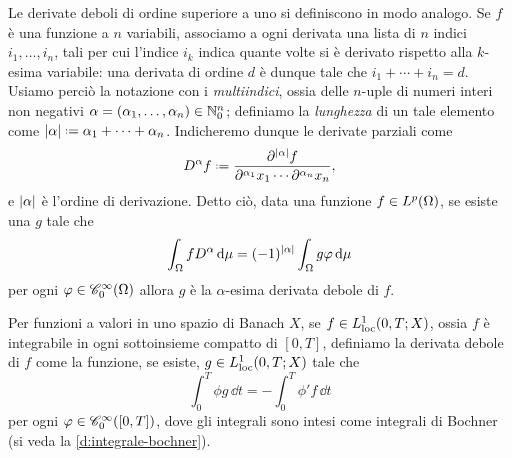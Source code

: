 Le derivate deboli di ordine superiore a uno si definiscono in modo analogo.
Se $f$ è una funzione a $n$ variabili, associamo a ogni derivata una lista di $n$ indici $i_1,\dotsc,i_n$, tali per cui l'indice $i_k$ indica quante volte si è derivato rispetto alla $k$-esima variabile: una derivata di ordine $d$ è dunque tale che $i_1+\dotsb+i_n=d$.
Usiamo perciò la notazione con i \emph{multiindici}, ossia delle $n$-uple di numeri interi non negativi $\alpha=(\alpha_1,\dotsc,\alpha_n)\in\N_0^n$; definiamo la \emph{lunghezza} di un tale elemento come $\abs{\alpha}\defeq\alpha_1+\dotsb+\alpha_n$.
Indicheremo dunque le derivate parziali come
\begin{equation}
    D^\alpha f\defeq\frac{\partial^{\abs{\alpha}}f}{\partial^{\alpha_1}x_1\dotsm\partial^{\alpha_n}x_n},
\end{equation}
e $\abs{\alpha}$ è l'ordine di derivazione.
Detto ciò, data una funzione $f\in\leb[p]{\Omega}$, se esiste una $g$ tale che
\begin{equation}
    \int_\Omega fD^\alpha\,\dd\mu=(-1)^{\abs{\alpha}}\int_\Omega g\phi\,\dd\mu
\end{equation}
per ogni $\phi\in\contsc[\infty]{\Omega}$ allora $g$ è la $\alpha$-esima derivata debole di $f$.

Per funzioni a valori in uno spazio di Banach $X$, se $f\in\locleb[1]{0,T;X}$, ossia $f$ è integrabile in ogni sottoinsieme compatto di $[0,T]$, definiamo la derivata debole di $f$ come la funzione, se esiste, $g\in\locleb[1]{0,T;X}$ tale che
\begin{equation}
    \int_0^T \phi g\,\dd t=-\int_0^T \phi'f\,\dd t
    \label{eq:derivata-debole-banach}
\end{equation}
per ogni $\phi\in\contsc[\infty]{[0,T]}$, dove gli integrali sono intesi come integrali di Bochner (si veda la \ref{d:integrale-bochner}).

